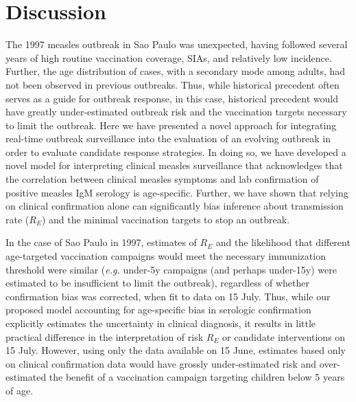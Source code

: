\section{Discussion}\label{discussion}

The 1997 measles outbreak in Sao Paulo was unexpected, having followed several years of high routine vaccination coverage, SIAs, and relatively low
incidence. Further, the age distribution of cases, with a secondary mode among adults, had not been observed in previous outbreaks. Thus, while
historical precedent often serves as a guide for outbreak response, in this case, historical precedent would have greatly under-estimated
outbreak risk and the vaccination targets necessary to limit the outbreak. Here we have presented a novel approach for integrating
real-time outbreak surveillance into the evaluation of an evolving outbreak in order to evaluate candidate response strategies. In doing
so, we have developed a novel model for interpreting clinical measles surveillance that acknowledges that the correlation between clinical
measles symptoms and lab confirmation of positive measles IgM serology is age-specific. Further, we have shown that relying on clinical
confirmation alone can significantly bias inference about transmission rate ($R_E$) and the minimal vaccination targets to stop an outbreak.

In the case of Sao Paulo in 1997, estimates of $R_E$ and the likelihood that different age-targeted vaccination campaigns would meet the
necessary immunization threshold were similar (\emph{e.g.} under-5y campaigns (and perhaps under-15y) were estimated to be insufficient to limit the outbreak), regardless of whether confirmation bias was corrected, when fit to data on 15 July. Thus, while our proposed model accounting for age-specific bias in serologic confirmation explicitly estimates the uncertainty in clinical diagnosis, it results in little practical difference in the interpretation of risk \(R_E\) or candidate interventions on 15 July. However, using only the data available on 15 June, estimates based only on clinical confirmation data would have grossly under-estimated risk and over-estimated the benefit of a vaccination campaign targeting children below 5 years of age. 

